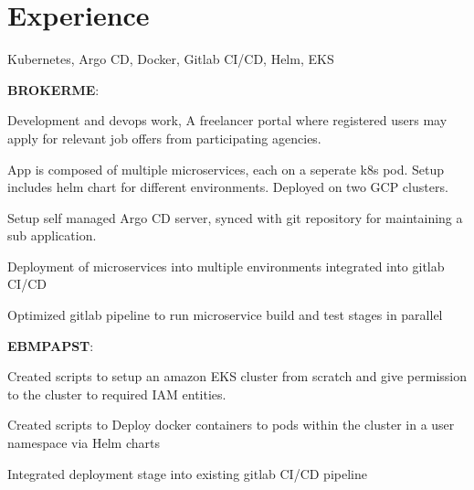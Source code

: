 \documentclass[]{font}
\begin{document}
\begin{minipage}[t]{0.66\textwidth} 


\section{Experience}

\location{ }
Kubernetes, Argo CD, Docker, Gitlab CI/CD, Helm, EKS
\vspace{\topsep}

\textbf{BROKERME}:
\vspace{\topsep}

\begin{tightemize}
\item Development and devops work, A freelancer portal where registered users may apply for relevant job offers from participating agencies.
\item App is composed of multiple microservices, each on a seperate k8s pod. Setup includes helm chart for different environments. Deployed on two GCP clusters.
\item Setup self managed Argo CD server, synced with git repository for maintaining a sub application.
\item Deployment of microservices into multiple environments integrated into gitlab CI/CD
\item Optimized gitlab pipeline to run microservice build and test stages in parallel
\end{tightemize}

\vspace{\topsep}
\textbf{EBMPAPST}:

\begin{tightemize}
\item Created scripts to setup an amazon EKS cluster from scratch and give permission to the cluster to required IAM entities.
\item Created scripts to Deploy docker containers to pods within the cluster in a user namespace via Helm charts
\item Integrated deployment stage into existing gitlab CI/CD pipeline
\end{tightemize}
\sectionsep


\end{minipage}
\end{document}
